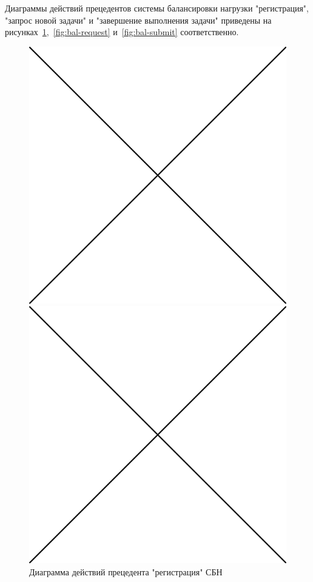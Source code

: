 \documentclass[a4paper,12pt]{report}
\numberwithin{equation}{section}
\begin{document}
Диаграммы действий прецедентов системы балансировки нагрузки "регистрация", "запрос новой задачи" и "завершение выполнения задачи" приведены на рисунках~\ref{fig:bal-register},~\ref{fig:bal-request} и~\ref{fig:bal-submit} соответственно.

\begin{figure}  
  \centering
  \begin{minipage}{.49\linewidth}
    \centering
    \includegraphics[width=\linewidth]{img/placeholder} %
    \caption{Диаграмма действий прецедента "регистрация" СБН}
    \label{fig:bal-register}
  \end{minipage}
  \hfill
  \begin{minipage}{.49\linewidth}
    \centering
    \includegraphics[width=\linewidth]{img/placeholder} %

\end{minipage}
\end{figure}
\end{document}
